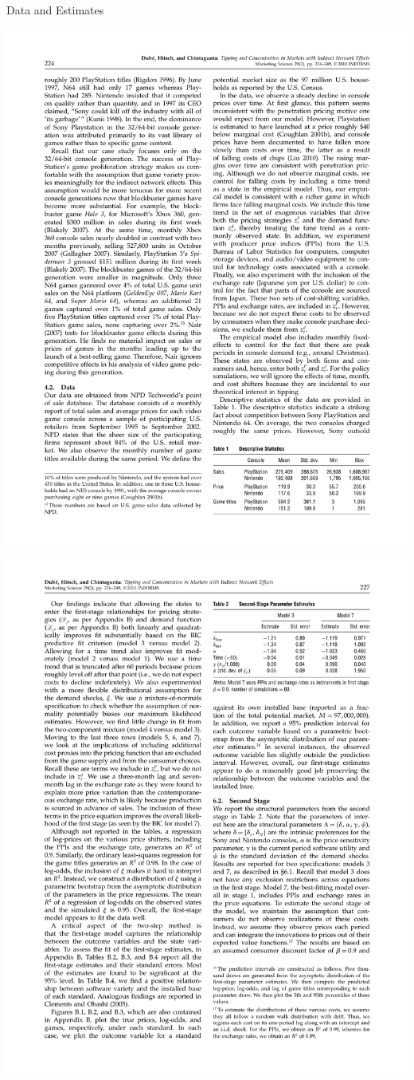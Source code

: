 \documentclass[xcolor=pdftex,dvipsnames,table,mathserif]{beamer}
\begin{document}
\begin{frame}{Data and Estimates}
\begin{center}
\includegraphics[scale=0.5]{resources/dube-table1}\\
\includegraphics[scale=0.5]{resources/dube-table2}

\end{center}
\end{frame}
\end{document}
